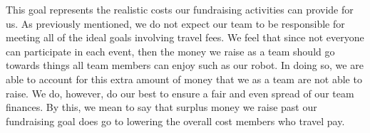 This goal represents the realistic costs our fundraising activities can provide for us. As previously mentioned, we do not expect our team to be responsible for meeting all of the ideal goals involving travel fees. We feel that since not everyone can participate in each event, then the money we raise as a team should go towards things all team members can enjoy such as our robot. In doing so, we are able to account for this extra amount of money that we as a team are not able to raise. We do, however, do our best to ensure a fair and even spread of our team finances. By this, we mean to say that surplus money we raise past our fundraising goal does go to lowering the overall cost members who travel pay. 


